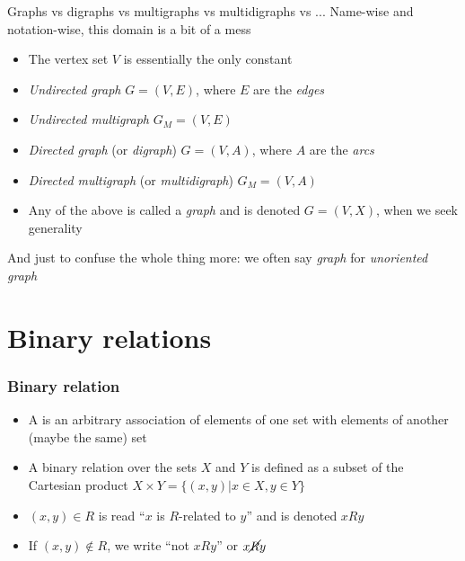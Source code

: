 \documentclass[aspectratio=169]{beamer}\usepackage[]{graphicx}\usepackage[]{xcolor}
\begin{document}
\begin{frame}{Graphs vs digraphs vs multigraphs vs multidigraphs vs ...}
	Name-wise and notation-wise, this domain is a bit of a mess
	\vfill
	\begin{itemize}
		\item The vertex set $V$ is essentially the only constant
		\item \emph{Undirected graph} $G=(V,E)$, where $E$ are the \emph{edges}
		\item \emph{Undirected multigraph} $G_M=(V,E)$
		\item \emph{Directed graph} (or \emph{digraph}) $G=(V,A)$, where $A$ are the \emph{arcs}
		\item \emph{Directed multigraph} (or \emph{multidigraph}) $G_M=(V,A)$
		\item Any of the above is called a \emph{graph} and is denoted $G=(V,X)$, when we seek generality
	\end{itemize}
	\vfill
And just to confuse the whole thing more: we often say \emph{graph} for \emph{unoriented graph}
\end{frame}

\section{Binary relations}


\begin{frame}\frametitle{Binary relation}
	\begin{definition}
	\begin{itemize}
	\item A  is an arbitrary association of elements of one set with elements of another (maybe the same) set
	\item  A binary relation over the sets $X$ and $Y$ is defined as a subset of the Cartesian product $X\times Y =\{(x,y)| x\in X , y\in Y\}$
	\item $(x,y)\in R$ is read ``$x$ is $R$-related to $y$'' and is denoted $xRy$
	\item If $(x,y)\not\in R$, we write ``not $x R y$'' or $x\cancel{R} y$
	\end{itemize}
	\end{definition}
\end{frame}
	
\end{document}
